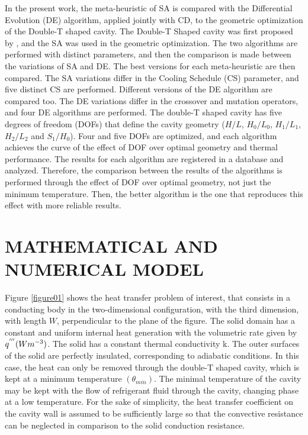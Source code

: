 \documentclass[12pt,fleqn]{article}
\begin{document}
In the present work, the meta-heuristic of SA is compared with the Differential Evolution (DE) algorithm, applied jointly with CD, to the geometric optimization of the Double-T shaped cavity. The Double-T Shaped cavity was first proposed by \cite{Gonzales2015b}, and the SA was used in the geometric optimization. The two algorithms are performed with distinct parameters, and then the comparison is made between the variations of SA and DE. The best versions for each meta-heuristic are then compared. The SA variations differ in the Cooling Schedule (CS) parameter, and five distinct CS are performed. Different versions of the DE algorithm are compared too. The DE variations differ in the crossover and mutation operators, and four DE algorithms are performed. The double-T shaped cavity has five degrees of freedom (DOFs) that define the cavity geometry ($H/L$, $H_{0}/L_{0}$, $H_{1}/L_{1}$, $H_{2}/L_{2}$ and $S_{1}/H_{0}$). Four and five DOFs are optimized, and each algorithm achieves the curve of the effect of DOF over optimal geometry and thermal performance. The results for each algorithm are registered in a database and analyzed. Therefore, the comparison between the results of the algorithms is performed through the effect of DOF over optimal geometry, not just the minimum temperature.  Then, the better algorithm is the one that reproduces this effect with more reliable results.

\section{MATHEMATICAL AND NUMERICAL MODEL}


Figure \ref{figure01} shows the heat transfer problem of interest, that consists in a conducting body in the two-dimensional configuration, with the third dimension, with length $W$, perpendicular to the plane of the figure. The solid domain has a constant and uniform internal heat generation with the volumetric rate given by $q^{'''}(Wm^{\tiny -3})$. The solid has a constant thermal conductivity k. The outer surfaces of the solid are perfectly insulated, corresponding to adiabatic conditions. In this case, the heat can only be removed through the double-T shaped cavity, which is kept at a minimum temperature $(\theta_{min})$. The minimal temperature of the cavity may be kept with the flow of refrigerant fluid through the cavity, changing phase at a low temperature. For the sake of simplicity, the heat transfer coefficient on the cavity wall is assumed to be sufficiently large so that the convective resistance can be neglected in comparison to the solid conduction resistance.
\end{document}
